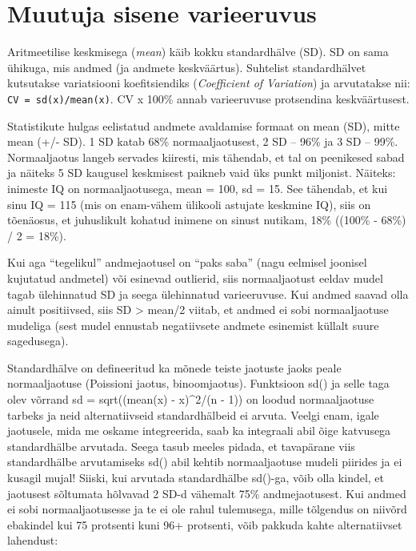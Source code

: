 \documentclass[]{book}
\begin{document}
\hypertarget{muutuja-sisene-varieeruvus}{%
\section*{Muutuja sisene varieeruvus}\label{muutuja-sisene-varieeruvus}}

Aritmeetilise keskmisega (\emph{mean}) käib kokku standardhälve (SD).
SD on sama ühikuga, mis andmed (ja andmete keskväärtus). Suhtelist standardhälvet kutsutakse variatsiooni koefitsiendiks (\emph{Coefficient of Variation}) ja arvutatakse nii: \texttt{CV\ =\ sd(x)/mean(x)}. CV x 100\% annab varieeruvuse protsendina keskväärtusest.

Statistikute hulgas eelistatud andmete avaldamise formaat on mean (SD), mitte mean (+/- SD). 1 SD katab 68\% normaaljaotusest, 2 SD -- 96\% ja 3 SD -- 99\%. Normaaljaotus langeb servades kiiresti, mis tähendab, et tal on peenikesed sabad ja näiteks 5 SD kaugusel keskmisest paikneb vaid üks punkt miljonist.
Näiteks: inimeste IQ on normaaljaotusega, mean = 100, sd = 15. See tähendab, et kui sinu IQ = 115 (mis on enam-vähem ülikooli astujate keskmine IQ), siis on tõenäosus, et juhuslikult kohatud inimene on sinust nutikam, 18\% ((100\% - 68\%) / 2 = 18\%).

Kui aga ``tegelikul'' andmejaotusel on ``paks saba'' (nagu eelmisel joonisel kujutatud andmetel) või esinevad outlierid, siis normaaljaotust eeldav mudel tagab ülehinnatud SD ja seega ülehinnatud varieeruvuse. Kui andmed saavad olla ainult positiivsed, siis SD \textgreater{} mean/2 viitab, et andmed ei sobi normaaljaotuse mudeliga (sest mudel ennustab negatiivsete andmete esinemist küllalt suure sagedusega).

Standardhälve on defineeritud ka mõnede teiste jaotuste jaoks peale normaaljaotuse (Poissioni jaotus, binoomjaotus). Funktsioon sd() ja selle taga olev võrrand sd = sqrt((mean(x) - x)\^{}2/(n - 1)) on loodud normaaljaotuse tarbeks ja neid alternatiivseid standardhälbeid ei arvuta. Veelgi enam, igale jaotusele, mida me oskame integreerida, saab ka integraali abil õige katvusega standardhälbe arvutada. Seega tasub meeles pidada, et tavapärane viis standardhälbe arvutamiseks sd() abil kehtib normaaljaotuse mudeli piirides ja ei kusagil mujal!
Siiski, kui arvutada standardhälbe sd()-ga, võib olla kindel, et jaotusest sõltumata hõlvavad 2 SD-d vähemalt 75\% andmejaotusest.
Kui andmed ei sobi normaaljaotusesse ja te ei ole rahul tulemusega, mille tõlgendus on niivõrd ebakindel kui 75 protsenti kuni 96+ protsenti, võib pakkuda kahte alternatiivset lahendust:
\end{document}
